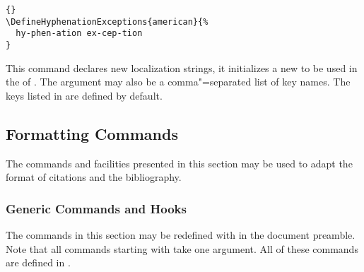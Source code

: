 \documentclass{ltxdockit}[2011/03/25]
\begin{document}
\begin{ltxsyntax}
\begin{lstlisting}[style=latex]{}
\DefineHyphenationExceptions{american}{%
  hy-phen-ation ex-cep-tion
}
\end{lstlisting}


This command declares new localization strings, \ie it initializes a new  to be used in the
 of . The  argument may also be a comma"=separated
list of key names. The keys listed in  are defined by default.

\end{ltxsyntax}

\subsection{Formatting Commands}
\label{use:fmt}

The commands and facilities presented in this section may be used to adapt the format of citations and the bibliography.

\subsubsection{Generic Commands and Hooks}
\label{use:fmt:fmt}

The commands in this section may be redefined with  in the document preamble. Note that all commands starting with  take one argument. All of these commands are defined in .
\end{document}
